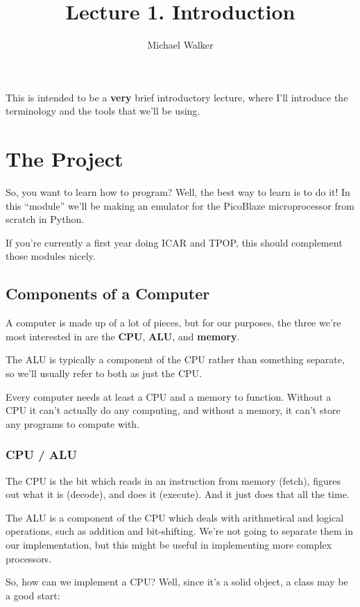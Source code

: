 \documentclass[12pt,a4paper]{article}
\author{Michael Walker}
\title{Lecture 1. Introduction}
\date{}
\begin{document}
\maketitle{}

This is intended to be a \textbf{very} brief introductory lecture,
where I'll introduce the terminology and the tools that we'll be
using.

\tableofcontents

\pagebreak
\section{The Project}

So, you want to learn how to program? Well, the best way to learn is
to do it! In this ``module'' we'll be making an emulator for the
PicoBlaze microprocessor from scratch in Python.

If you're currently a first year doing ICAR and TPOP, this should
complement those modules nicely.

\pagebreak
\subsection{Components of a Computer}

A computer is made up of a lot of pieces, but for our purposes, the
three we're most interested in are the \textbf{CPU}, \textbf{ALU}, and
\textbf{memory}.

The ALU is typically a component of the CPU rather than something
separate, so we'll usually refer to both as just the CPU.

Every computer needs at least a CPU and a memory to function. Without
a CPU it can't actually do any computing, and without a memory, it
can't store any programs to compute with.

\subsubsection{CPU / ALU}

The CPU is the bit which reads in an instruction from memory (fetch),
figures out what it is (decode), and does it (execute). And it just
does that all the time.

The ALU is a component of the CPU which deals with arithmetical and
logical operations, such as addition and bit-shifting. We're not going
to separate them in our implementation, but this might be useful in
implementing more complex processors.

So, how can we implement a CPU? Well, since it's a solid object, a
class may be a good start:
\end{document}
